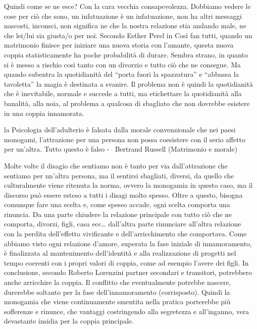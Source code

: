 \documentclass[12pt]{book} %
\begin{document}
Quindi come se ne esce? Con la cara vecchia consapevolezza. Dobbiamo vedere le cose per ciò che sono, un infatuazione è
un infatuazione, non ha altri messaggi nascosti, inconsci, non significa ne che la nostra relazione stia andando male,
ne che lei/lui sia giusta/o per noi. Secondo Esther Perel in Così fan
tutti, quando un matrimonio finisce per iniziare una nuova storia con
l'amante, questa nuova coppia statisticamente ha poche probabilità di durare. Sembra strano, in
quanto si è messo a rischio così tanto con un divorzio e tutto ciò che ne consegue. Ma quando subentra la quotidianità
del “porta fuori la spazzatura” e “abbassa la tavoletta” la magia è destinata a svanire. Il problema non è quindi la
quotidianità che è inevitabile, normale e succede a tutti, ma etichettare la quotidianità alla banalità, alla noia, al
problema a qualcosa di sbagliato che non dovrebbe esistere in una coppia
innamorata.

la Psicologia dell'adulterio è falsata dalla morale convenzionale che nei paesi monogami,
l'attrazione per una persona non possa coesistere con il serio affetto per
un'altra. Tutto questo è falso - \ Bertrand Russell (Matrimonio e
morale)

Molte volte il disagio che sentiamo non è tanto per via dall'attrazione che sentiamo per
un'altra persona, ma il sentirsi sbagliati, diversi, da quello che culturalmente viene ritenuta la
norma, ovvero la monogamia in questo caso, ma il discorso può essere esteso a tutti i disagi molto spesso. Oltre a
questo, bisogna comunque fare una scelta e, come spesso accade, ogni scelta comporta una rinuncia. Da una parte
chiudere la relazione principale con tutto ciò che ne comporta, divorzi, figli, casa ecc…
dall'altra parte rinunciare all'altra relazione con la perdita
dell'effetto vivificante e dell'arricchimento che comportava. Come abbiamo
visto ogni relazione d'amore, superata la fase iniziale di innamoramento, è finalizzata al
mantenimento dell'identità e alla realizzazione di progetti nel tempo coerenti con i propri valori
di coppia, come ad esempio l'avere dei figli. In conclusione, secondo Roberto Lorenzini partner
secondari e transitori, potrebbero anche arricchire la coppia. Il conflitto che eventualmente potrebbe nascere,
durerebbe soltanto per la fase dell'innamoramento (corrisposto). Quindi la monogamia che viene
continuamente smentita nella pratica porterebbe più sofferenze e rinunce, che vantaggi costringendo alla segretezza e
all'inganno, vera devastante insidia per la coppia principale. 
\end{document}
